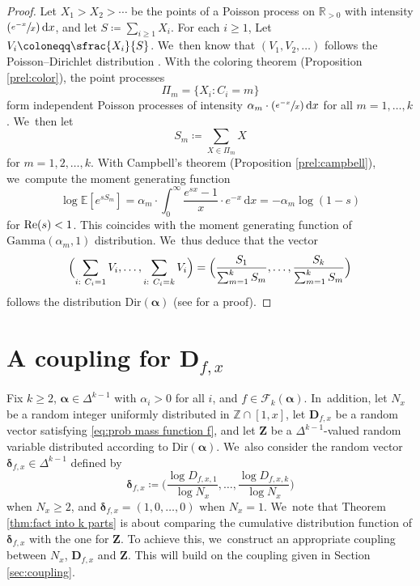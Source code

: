 \documentclass[10pt]{amsart}
\newcommand{\bD}{{\boldsymbol D}}
\newcommand{\bZ}{{\boldsymbol Z}}
\newcommand{\Psfrac}[2]{(\sfrac{#1}{#2})}
\newcommand{\ZZ}{\mathbb{Z}}
\newcommand{\RR}{\mathbb{R}}
\newcommand{\EE}{\mathbb{E}}
\newcommand{\boldalpha}{\boldsymbol{\alpha}}
\newcommand{\bolddelta}{\boldsymbol{\delta}}
\newcommand{\riemint}[4]{\int_{#1}^{#2}\! #3 \, \mathrm{d}#4}
\renewcommand{\Re}{\textup{Re}}
\newcommand{\simplex}{\Delta^{k-1}}
\newcommand{\bgg}{\Big}
\theoremstyle{plain}
\theoremstyle{definition}
\begin{document}
\begin{proof}
Let $X_1 > X_2 > \cdots$ be the points of a Poisson process on $\RR_{>0}$ with intensity $\Psfrac{e^{-x}}{x} \, \mathrm dx$, and let $S \coloneqq \sum_{i \ge 1} X_i$. For each $i \ge 1$, Let $V_i \coloneqq \sfrac{X_i}{S}$. We~then know that $(V_1, V_2, \ldots)$ follows the Poisson--Dirichlet distribution \cite[Th.\,2.2]{Feng10}. With the coloring theorem (Proposition \ref{prel:color}), the point processes
\[
\Pi_m = \{X_i : C_i = m\}
\]
form independent Poisson processes of intensity $\alpha_m\cdot \Psfrac{e^{-x}}{x} \, \mathrm dx$ for all $m = 1, \ldots, k$. We~then let
\[
S_m \coloneqq \sum_{X \in \Pi_m} X
\]
for $m=1,2,\dots,k$. With Campbell's theorem (Proposition \ref{prel:campbell}), we~compute the moment generating function
\[
\log \EE[e^{sS_m}] = \alpha_m\cdot \riemint{0}{\infty}{\frac{e^{sx}-1}{x}\cdot e^{-x}}{x} = -\alpha_m\log(1-s)
\]
for $\Re(s) < 1$. This coincides with the moment generating function of $\text{Gamma}(\alpha_m, 1)$ distribution. We~thus deduce that the vector
\[
\Bigl(\sum_{i:\ C_i = 1} V_i, \ldots, \sum_{i:\ C_i = k} V_i \Bigr) = \Bigl(\frac{S_1}{\sum_{m=1}^k S_m}, \ldots, \frac{S_k}{\sum_{m=1}^k S_m} \Bigr)
\]
follows the distribution $\text{Dir}(\boldalpha)$ (see \cite[Ch.\,49, pp.\,485-487]{KotzBal00} for a proof).
\end{proof}

\section{A coupling for \texorpdfstring{$\bD_{f, x}$}{bD}}\label{sec:coupling for factorizations}

Fix $k\ge2$, $\boldalpha \in \simplex$ with $\alpha_i>0$ for all $i$, and $f\in\mathcal{F}_k(\boldalpha)$. In~addition, let $N_x$ be a random integer uniformly distributed in $\ZZ \cap [1, x]$, let $\bD_{f, x}$ be a random vector satisfying \eqref{eq:prob mass function f}, and let $\bZ$ be a $\simplex$-valued random variable distributed according to $\text{Dir}(\boldalpha)$. We~also consider the random vector $\bolddelta_{f, x} \in \Delta^{k-1}$ defined by
\begin{equation}
\label{eq:defn delta}
\bolddelta_{f, x} \coloneqq \bgg(\frac{\log D_{f,x,1}}{\log N_x},\dots,\frac{\log D_{f,x,k}}{\log N_x}\bgg)
\end{equation}
when $N_x \ge 2$, and $\bolddelta_{f,x} = (1,0,\ldots,0)$ when $N_x = 1$. We~note that Theorem \ref{thm:fact into k parts} is about comparing the cumulative distribution function of $\bolddelta_{f, x}$ with the one for $\bZ$. To achieve this, we~construct an appropriate coupling between $N_x$, $\bD_{f, x}$ and $\bZ$. This will build on the coupling given in Section \ref{sec:coupling}.
\end{document}
